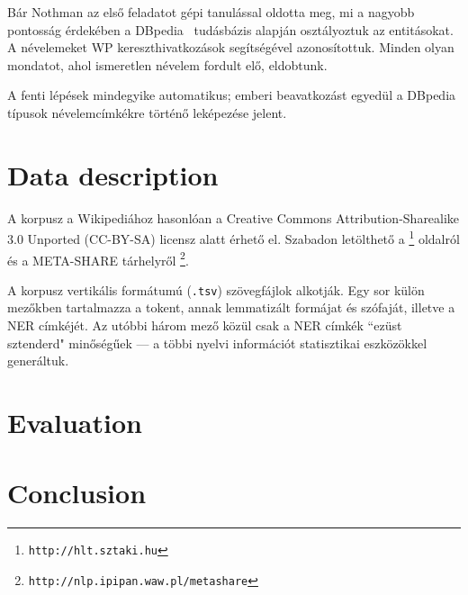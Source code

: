\documentclass{llncs}
\begin{document}
Bár Nothman az első feladatot gépi tanulással oldotta meg, mi a nagyobb
pontosság érdekében a DBpedia~\cite{Bizer:09} tudásbázis alapján osztályoztuk az
entitásokat. A névelemeket WP kereszthivatkozások segítségével azonosítottuk. Minden
olyan mondatot, ahol ismeretlen névelem fordult elő, eldobtunk.

A fenti lépések mindegyike automatikus; emberi beavatkozást egyedül a DBpedia típusok
névelemcímkékre történő leképezése jelent.

\section{Data description}

A korpusz a Wikipediához hasonlóan a Creative Commons Attribution-Sharealike
3.0 Unported (CC-BY-SA) licensz alatt érhető el. Szabadon letölthető a
\footnote{\texttt{http://hlt.sztaki.hu}} oldalról és a META-SHARE tárhelyről
\footnote{\texttt{http://nlp.ipipan.waw.pl/metashare}}.

A korpusz vertikális formátumú (\texttt{.tsv}) szövegfájlok alkotják. Egy sor külön
mezőkben tartalmazza a tokent, annak lemmatizált formájat és szófaját, illetve a NER
címkéjét. Az utóbbi három mező közül csak a NER címkék ``ezüst sztenderd" minőségűek
--- a többi nyelvi információt statisztikai eszközökkel generáltuk.

\section{Evaluation}

\section{Conclusion}

\cite{Nothman:08} \cite{Szarvas:06} \cite{Medelyan:09}

%
%


\end{document}
